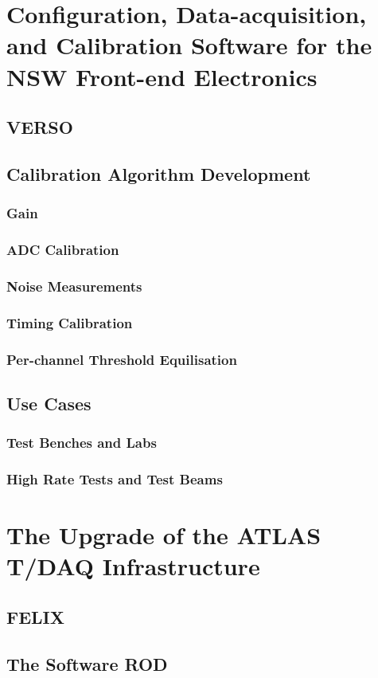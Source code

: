 \section{Configuration, Data-acquisition, and Calibration Software for the NSW Front-end Electronics}
\subsection{VERSO}
\subsection{Calibration Algorithm Development}
\subsubsection{Gain}
\subsubsection{ADC Calibration}
\subsubsection{Noise Measurements}
\subsubsection{Timing Calibration}
\subsubsection{Per-channel Threshold Equilisation}
\subsection{Use Cases}
\subsubsection{Test Benches and Labs}
\subsubsection{High Rate Tests and Test Beams}

\section{The Upgrade of the ATLAS T/DAQ Infrastructure}
\subsection{FELIX}
\subsection{The Software ROD}
